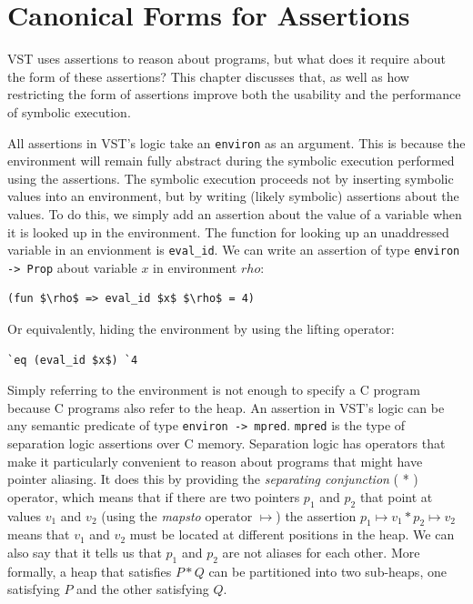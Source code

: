 \documentclass{puthesis}
\begin{document}
\chapter{Canonical Forms for Assertions}
\label{ch:canonical}

VST uses assertions to reason about programs, but what does it require
about the form of these assertions? This chapter discusses that, as
well as how restricting the form of assertions improve both the
usability and the performance of symbolic execution.

All assertions in VST's logic take an \lstinline|environ| as an
argument. This is because the environment will remain fully abstract
during the symbolic execution performed using the assertions. The
symbolic execution proceeds not by inserting symbolic values into an
environment, but by writing (likely symbolic) assertions about the
values. To do this, we simply add an assertion about the value of a
variable when it is looked up in the environment. The function for
looking up an unaddressed variable in an envionment is
\lstinline|eval_id|. We can write an assertion of type
\lstinline|environ -> Prop| about variable $x$ in environment $rho$:

\begin{lstlisting}
(fun $\rho$ => eval_id $x$ $\rho$ = 4)
\end{lstlisting}

Or equivalently, hiding the environment by using the lifting operator:

\begin{lstlisting}
`eq (eval_id $x$) `4
\end{lstlisting}

Simply referring to the environment is not enough to specify a C
program because C programs also refer to the heap. An assertion in
VST's logic can be any semantic predicate of type 
\lstinline|environ -> mpred|. 
\lstinline|mpred| is the type of separation logic assertions over C
memory. Separation logic has operators that make it particularly
convenient to reason about programs that might have pointer
aliasing. It does this by providing the \emph{separating conjunction}
( * ) operator, which means that if there are two pointers $p_1$ and
$p_2$ that point at values $v_1$ and $v_2$ (using the \emph{mapsto}
operator $\mapsto$) the assertion $p_1 \mapsto v_1 * p_2 \mapsto v_2$
means that $v_1$ and $v_2$ must be located at different positions in
the heap. We can also say that it tells us that $p_1$ and $p_2$ are
not aliases for each other. More formally, a heap that satisfies
$P * Q$ can be partitioned into two sub-heaps, one satisfying $P$ and
the other satisfying $Q$.
\end{document}
